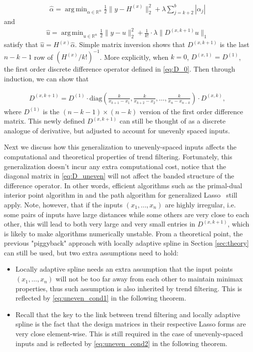 \documentclass[a4paper]{article}
\DeclareMathOperator*{\argmin}{arg\,min}
\newcommand{\RR}{\mathbb{R}}
\begin{document}
\begin{align*}
\hat{\alpha} = \argmin_{\alpha\in\RR^n} \frac{1}{2}\|y-H^{(x)}\|_2^2 + \lambda\sum_{j=k+2}^b|\alpha_j|
\end{align*}
and 
\begin{align*}
\hat{u} = \argmin_{u\in\RR^n} \frac{1}{2}\|y-u\|_2^2 + \frac{1}{k!}\cdot\lambda\|D^{(x,k+1)}u\|_1
\end{align*}
satisfy that $\hat{u} = H^{(x)}\hat{\alpha}$. Simple matrix inversion shows that $D^{(x,k+1)}$ is the last $n-k-1$ row of $(H^{(x)}/k!)^{-1}$. More explicitly, when $k = 0$, $D^{(x,1)} = D^{(1)}$, the first order discrete difference operator defined in \eqref{eq:D_0}. Then through induction, we can show that

\begin{align}
D^{(x,k+1)} = D^{(1)} \cdot \mbox{diag}(\frac{k}{x_{k+1}-x_1}, \frac{k}{x_{k+2} - x_2}, \ldots, \frac{k}{x_n-x_{n-k}}) \cdot D^{(x,k)},
\label{eq:D_uneven}
\end{align}
where $D^{(1)}$ is the $(n-k-1) \times (n-k)$ version of the first order difference matrix. This newly defined $D^{(x, k+1)}$ can still be thought of as a discrete analogue of derivative, but adjusted to account for unevenly spaced inputs.

Next we discuss how this generalization to unevenly-spaced inputs affects the computational and theoretical properties of trend filtering. Fortunately, this generalization doesn't incur any extra computational cost, notice that the diagonal matrix in \eqref{eq:D_uneven} will not affect the banded structure of the difference operator. In other words, efficient algorithms such as the primal-dual interior point algorithm in \cite{kim2009ell_1} and the path algorithm for generalized Lasso~\cite{harchaoui2010multiple,tibshirani2011solution} still apply. Note, however, that if the inputs $(x_1,\ldots, x_n)$ are highly irregular, i.e. some pairs of inputs have large distances while some others are very close to each other, this will lead to both very large and very small entries in $D^{(x,k+1)}$, which is likely to make algorithms numerically unstable. From a theoretical point, the previous "piggyback" approach with locally adaptive spline in Section \ref{sec:theory} can still be used, but two extra assumptions need to hold: 

\begin{itemize}
\item Locally adaptive spline needs an extra assumption that the input points $(x_1,\ldots, x_n)$ will not be too far away from each other to maintain minimax properties, thus such assumption is also inherited by trend filtering. This is reflected by \eqref{eq:uneven_cond1} in the following theorem.
\item Recall that the key to the link between trend filtering and locally adaptive spline is the fact that the design matrices in their respective Lasso forms are very close element-wise. This is still required in the case of unevenly-spaced inputs and is reflected by \eqref{eq:uneven_cond2} in the following theorem.
\end{itemize}
\end{document}
